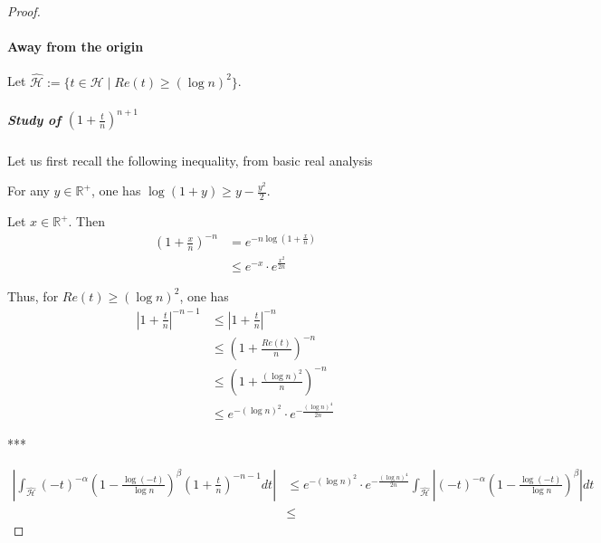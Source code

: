 \documentclass[../main.tex]{subfiles}
\begin{document}
\begin{proof}
	\paragraph{Away from the origin}
	Let $\hat{\mathcal{H}} := \{t \in \mathcal{H} \mid Re(t) \geq {(\log n)}^2 \}$.
	
	\subparagraph{Study of $\left(1 + \frac{t}{n} \right)^{n+1}$}
	Let us first recall the following inequality, from basic real analysis
	\begin{remark}
		For any $y \in \mathbb{R}^+$, one has $\log (1 + y) \geq y - \frac{y^2}{2}$.
	\end{remark}
	
	Let $x \in \mathbb{R}^+$. Then
	\begin{align*}
	{\left(1 + \frac{x}{n} \right)}^{-n}
	&= e^{-n \log \left( 1 + \frac{x}{n} \right)}\\
	&\leq e^{-x} \cdot e^{\frac{x^2}{2n}}
	\end{align*}
	
	Thus, for $Re(t) \geq {\left(\log n \right)}^2$, one has
	\begin{align*}
		{\left|1 + \frac{t}{n}\right|}^{-n-1} &\leq {\left|1 + \frac{t}{n}\right|}^{-n}\\
				&\leq {\left(1 + \frac{Re(t)}{n} \right)}^{-n}\\
				&\leq {\left(1 + \frac{{\left(\log n \right)}^2}{n}\right)}^{-n}\\
				&\leq e^{-{(\log n)}^2} \cdot e^{-\frac{{(\log n)}^4}{2n}}
	\end{align*}
	
	***
	
	
%	
	
	\begin{align*}
	\left| \int_{\hat{\mathcal{H}}} {(-t)}^{-\alpha} {\left( 1 - \frac{\log (-t)}{\log n} \right)}^\beta  {\left( 1 + \frac{t}{n} \right)}^{-n-1} dt \right|
	&\leq e^{-{(\log n)}^2} \cdot e^{-\frac{{(\log n)}^4}{2n}} \int_{\hat{\mathcal{H}}} \left| {(-t)}^{-\alpha} {\left( 1 - \frac{\log (-t)}{\log n} \right)}^\beta \right| dt\\
	&\leq
	\end{align*}
	

\end{proof}
\end{document}
